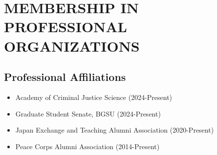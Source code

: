 \documentclass[11pt,letterpaper]{article}
\begin{document}
\section{MEMBERSHIP IN PROFESSIONAL ORGANIZATIONS}

\subsection*{Professional Affiliations}
\begin{itemize}
    \item Academy of Criminal Justice Science (2024-Present)
    \item Graduate Student Senate, BGSU (2024-Present)
    \item Japan Exchange and Teaching Alumni Association (2020-Present)
    \item Peace Corps Alumni Association (2014-Present)
\end{itemize}
\end{document}

